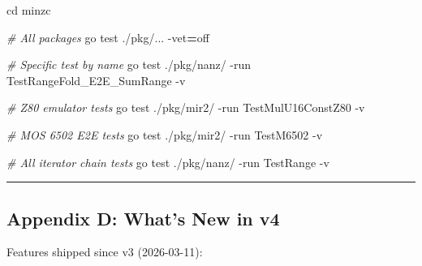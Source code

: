\documentclass[
  11pt,
  a4paper,
]{report}
\newenvironment{Shaded}{\begin{snugshade}\small}{\end{snugshade}}
\newcommand{\AttributeTok}[1]{\textcolor[rgb]{0.13,0.29,0.53}{#1}}
\newcommand{\BuiltInTok}[1]{#1}
\newcommand{\CommentTok}[1]{\textcolor[rgb]{0.56,0.35,0.01}{\textit{#1}}}
\newcommand{\ExtensionTok}[1]{#1}
\newcommand{\NormalTok}[1]{#1}
\newcommand{\OperatorTok}[1]{\textcolor[rgb]{0.81,0.36,0.00}{\textbf{#1}}}
\begin{document}
\begin{Shaded}
\begin{Highlighting}[]
\BuiltInTok{cd}\NormalTok{ minzc}

\CommentTok{\# All packages}
\ExtensionTok{go}\NormalTok{ test ./pkg/... }\AttributeTok{{-}vet}\OperatorTok{=}\NormalTok{off}

\CommentTok{\# Specific test by name}
\ExtensionTok{go}\NormalTok{ test ./pkg/nanz/ }\AttributeTok{{-}run}\NormalTok{ TestRangeFold\_E2E\_SumRange }\AttributeTok{{-}v}

\CommentTok{\# Z80 emulator tests}
\ExtensionTok{go}\NormalTok{ test ./pkg/mir2/ }\AttributeTok{{-}run}\NormalTok{ TestMulU16ConstZ80 }\AttributeTok{{-}v}

\CommentTok{\# MOS 6502 E2E tests}
\ExtensionTok{go}\NormalTok{ test ./pkg/mir2/ }\AttributeTok{{-}run}\NormalTok{ TestM6502 }\AttributeTok{{-}v}

\CommentTok{\# All iterator chain tests}
\ExtensionTok{go}\NormalTok{ test ./pkg/nanz/ }\AttributeTok{{-}run}\NormalTok{ TestRange }\AttributeTok{{-}v}
\end{Highlighting}
\end{Shaded}

\begin{center}\rule{0.5\linewidth}{0.5pt}\end{center}

\subsection{Appendix D: What's New in
v4}\label{appendix-d-whats-new-in-v4}

Features shipped since v3 (2026-03-11):
\end{document}
